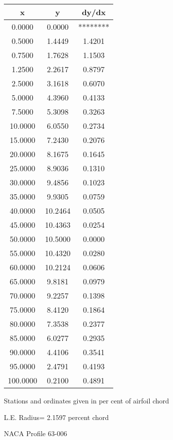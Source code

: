 \documentclass[11pt]{book}
\begin{document}
 \vspace{8mm}
 \begin{tabular}{|c|c|c|} \hline 
  x  &  y  &  dy/dx \\
 \hline
0.0000 & 0.0000 & ******** \\
0.5000 & 1.4449 & 1.4201 \\
0.7500 & 1.7628 & 1.1503 \\
1.2500 & 2.2617 & 0.8797 \\
2.5000 & 3.1618 & 0.6070 \\
5.0000 & 4.3960 & 0.4133 \\
7.5000 & 5.3098 & 0.3263 \\
10.0000 & 6.0550 & 0.2734 \\
15.0000 & 7.2430 & 0.2076 \\
20.0000 & 8.1675 & 0.1645 \\
25.0000 & 8.9036 & 0.1310 \\
30.0000 & 9.4856 & 0.1023 \\
35.0000 & 9.9305 & 0.0759 \\
40.0000 & 10.2464 & 0.0505 \\
45.0000 & 10.4363 & 0.0254 \\
50.0000 & 10.5000 & 0.0000 \\
55.0000 & 10.4320 & 0.0280 \\
60.0000 & 10.2124 & 0.0606 \\
65.0000 & 9.8181 & 0.0979 \\
70.0000 & 9.2257 & 0.1398 \\
75.0000 & 8.4120 & 0.1864 \\
80.0000 & 7.3538 & 0.2377 \\
85.0000 & 6.0277 & 0.2935 \\
90.0000 & 4.4106 & 0.3541 \\
95.0000 & 2.4791 & 0.4193 \\
100.0000 & 0.2100 & 0.4891 \\
 \hline
 \end{tabular}
 \vspace{8mm}


Stations and ordinates given in per cent of airfoil chord 


L.E. Radius=  2.1597 percent chord
 \newpage
  \label{p63-006}
 \begin{Large}
 NACA Profile 63-006
 \end{Large}
  
\end{document}

